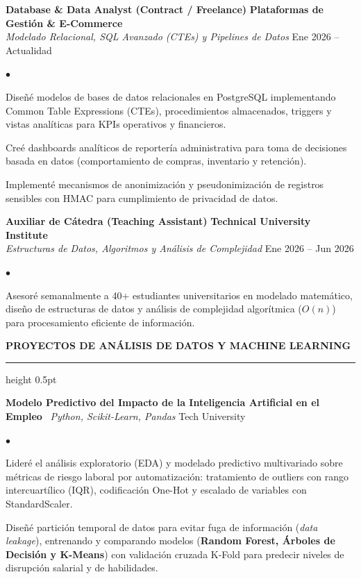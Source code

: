 \documentclass[10pt,letterpaper]{article}
\newcommand{\resumesection}[1]{%
  \vspace{2pt}%
  {\color{primary}\normalsize\bfseries\MakeUppercase{#1}}%
  \vspace{1pt}\hrule height 0.5pt\vspace{2pt}%
}
\renewenvironment{itemize}{%
  \begin{list}{\color{primary}$\bullet$}{%
    \setlength{\leftmargin}{1.1em}%
    \setlength{\itemsep}{0.2pt}%
    \setlength{\topsep}{0.5pt}%
    \setlength{\parsep}{0pt}%
    \setlength{\partopsep}{0pt}%
  }%
}{%
  \end{list}%
}
\begin{document}
\vspace{1.5pt}

\textbf{Database \& Data Analyst (Contract / Freelance)} \hfill \textbf{Plataformas de Gestión \& E-Commerce} \\
\textit{Modelado Relacional, SQL Avanzado (CTEs) y Pipelines de Datos} \hfill Ene 2026 -- Actualidad
\begin{itemize}
    \item Diseñé modelos de bases de datos relacionales en PostgreSQL implementando Common Table Expressions (CTEs), procedimientos almacenados, triggers y vistas analíticas para KPIs operativos y financieros.
    \item Creé dashboards analíticos de reportería administrativa para toma de decisiones basada en datos (comportamiento de compras, inventario y retención).
    \item Implementé mecanismos de anonimización y pseudonimización de registros sensibles con HMAC para cumplimiento de privacidad de datos.
\end{itemize}

\vspace{1.5pt}

\textbf{Auxiliar de Cátedra (Teaching Assistant)} \hfill \textbf{Technical University Institute} \\
\textit{Estructuras de Datos, Algoritmos y Análisis de Complejidad} \hfill Ene 2026 -- Jun 2026
\begin{itemize}
    \item Asesoré semanalmente a 40+ estudiantes universitarios en modelado matemático, diseño de estructuras de datos y análisis de complejidad algorítmica ($O(n)$) para procesamiento eficiente de información.
\end{itemize}

\resumesection{Proyectos de Análisis de Datos y Machine Learning}

\textbf{Modelo Predictivo del Impacto de la Inteligencia Artificial en el Empleo} \textbar\ \textit{Python, Scikit-Learn, Pandas} \hfill Tech University
\begin{itemize}
    \item Lideré el análisis exploratorio (EDA) y modelado predictivo multivariado sobre métricas de riesgo laboral por automatización: tratamiento de outliers con rango intercuartílico (IQR), codificación One-Hot y escalado de variables con StandardScaler.
    \item Diseñé partición temporal de datos para evitar fuga de información (\textit{data leakage}), entrenando y comparando modelos (\textbf{Random Forest, Árboles de Decisión y K-Means}) con validación cruzada K-Fold para predecir niveles de disrupción salarial y de habilidades.
\end{itemize}
\end{document}

